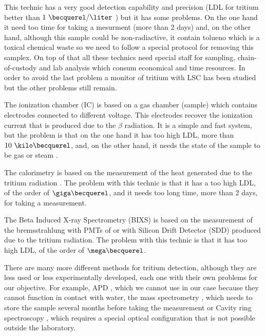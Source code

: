 This technic has a very good detection capability and precision (LDL for tritium better than $1~\becquerel/\liter$ \cite{0.6Bq_L}) but it has some problems. On the one hand it need too time for taking a mesurment (more than $2$ days) and, on the other hand, although this sample could be non-radiactive, it contain tolueno which is a toxical chemical waste so we need to follow a special protocol for removing this samplex. On top of that all these technics need special staff for sampling, chain-of-custody and lab analysis which consum economical and time resources. In order to avoid the last problem a monitor of tritium with LSC has been studied \cite{OnlineLSC} but the other problems still remain. 

The ionization chamber (IC) is based on a gas chamber (sample) which contains electrodes connected to different voltage. This electrodes recover the ionization current that is produced due to the $\beta$ radiation. It is a simple and fast system, but the problem is that on the one hand it has too high LDL, more than $ 10~\kilo\becquerel$, and, on the other hand, it needs the state of the sample to be gas or steam \cite{IonizationChamber1} \cite{IonizationChamber2}.

The calorimetry is based on the measurement of the heat generated due to the tritium radiation \cite{Calorimeter1} \cite{Calorimeter2}. The problem with this technic is that it has a too high LDL, of the order of $\giga\becquerel$, and it needs too long time, more than 2 days, for taking a measurement.

The Beta Induced X-ray Spectrometry (BIXS) is based on the measurement of the bremsstrahlung with PMTs of  \cite{XRays1} \cite{XRays2} or with Silicon Drift Detector (SDD) \cite{Bremstrahlung} produced due to the tritium radiation. The problem with this technic is that it has too high LDL, of the order of $\mega\becquerel$.

There are many more different methods for tritium detection, although they are less used or less experimentally developed, each one with their own problems for our objective. For example,  APD \cite{APD}, which we cannot use in our case because they cannot function in contact with water, the mass spectrometry \cite{Spectrometry}, which needs to store the sample several months before taking the measurement or Cavity ring spectroscopy \cite{Ring}, which requires a special optical configuration that is not possible outside the laboratory.

